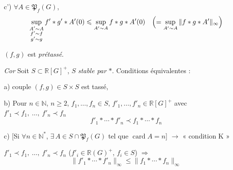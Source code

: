 \documentclass[11pt,a4paper]{article}
\begin{document}
c') $\forall A\in\mathfrak{P}_f(G)$,
\[
  \sup_{\substack{A'\sim A\\ f'\sim f\\ g'\sim g}}f'*g'*A'(0)\leqslant\sup_{A'\sim A}f*g*A'(0)\quad\Bigl(=\sup_{A'\sim A}\|f*g*A'\|_\infty\Bigr)
\]

 $(f,g)$ est \emph{prétassé}.

\emph{Cor} Soit $S\subset\mathbb{R}[G]^+$, $S$ \emph{stable par} $*$.  Conditions équivalentes :

a) \struck{\ill{}}  couple $(f,g)\in S\times S$ est tassé, 

b)  Pour  $n\in\mathbb{N}$, $n\geqslant2$, $f_1,\ldots,f_n\in S$, $f'_1,\ldots,f'_n\in\mathbb{R}[G]^+$ avec $f'_1\prec f_1,\ \ldots,\ f'_n\prec f_n$
\[
  f'_1*\cdots*f'_n\prec f_1*\cdots*f_n
\]

c) [Si $\forall n\in\mathbb{N}^*$, $\exists\,A\in S\cap\mathfrak{P}_f(G)$ tel que $\operatorname{card}A=n$] $\longrightarrow$ « condition K »

$f'_1\prec f_1,\ \ldots,\ f'_n\prec f_n$ ($f'_i\in\mathbb{R}(G)^+$, $f_i\in S$) $\Longrightarrow$
\[
  \|f'_1*\cdots*f'_n\|_\infty\leqslant\|f_1*\cdots*f_n\|_\infty
\]

\end{document}
